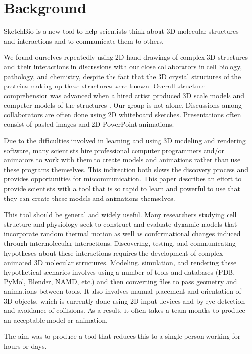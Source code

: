 \documentclass[twocolumn]{bmcart}%
\begin{document}
\section*{Background}

SketchBio is a new tool to help scientists think about 3D molecular structures and interactions and to communicate them to others.

We found ourselves repeatedly using 2D hand-drawings of complex 3D structures and their interactions in discussions with our close collaborators in cell biology, pathology, and chemistry, despite the fact that the 3D crystal structures of the proteins making up these structures were known.
Overall structure comprehension was advanced when a hired artist produced 3D scale models and computer models of the structures \cite{taylor2012}.  Our group is not alone.  Discussions among collaborators are often done using 2D whiteboard sketches.  Presentations often consist of pasted images and 2D PowerPoint animations.

Due to the difficulties involved in learning and using 3D modeling and rendering software, many scientists hire professional computer programmers and/or animators to work with them to create models and animations rather than use these programs themselves.
This indirection both slows the discovery process and provides opportunities for miscommunication.
This paper describes an effort to provide scientists with a tool that is so rapid to learn and powerful to use that they can create these models and animations themselves.

This tool should be general and widely useful.  Many researchers studying cell structure and physiology seek to construct and evaluate dynamic models that incorporate random thermal motion as well as conformational changes induced through intermolecular interactions.
Discovering, testing, and communicating hypotheses about these interactions requires the development of complex animated 3D molecular structures. Modeling, simulation, and rendering these hypothetical scenarios involves using a number of tools and databases (PDB, PyMol, Blender, NAMD, etc.) and then converting files to pass geometry and animations between tools. It also involves manual placement and orientation of 3D objects, which is currently done using 2D input devices and by-eye detection and avoidance of collisions. As a result, it often takes a team months to produce an acceptable model or animation.

The aim was to produce a tool that reduces this to a single person working for hours or days.
\end{document}
